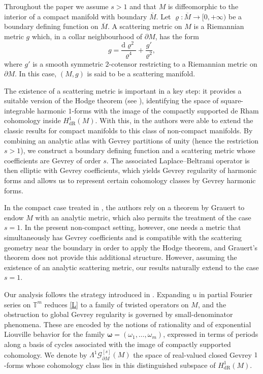 \documentclass[11pt,reqno]{amsart}
\numberwithin{equation}{section}
\begin{document}
	Throughout the paper we assume $s>1$ and that $M$ is diffeomorphic to the interior of a compact manifold with boundary $\overline{M}$. 
	Let $\varrho:\overline{M}\to[0,+\infty)$ be a boundary defining function on $\overline{M}$. 
	A scattering metric on $M$ is a Riemannian metric $g$ which, in a collar neighbourhood of $\partial M$, has the form
	\begin{equation*}
		g = \frac{\mathrm{d}\varrho^2}{\varrho^4}+\frac{g'}{\varrho^2},
	\end{equation*}
	where $g'$ is a smooth symmetric $2$-cotensor restricting to a Riemannian metric on $\partial M$. In this case, $(M,g)$ is said to be a scattering manifold.
	
	The existence of a scattering metric is important in a key step: it provides a suitable version of the Hodge theorem (see \cite[Theorem~6.2]{Melrose_GST}), identifying the space of square-integrable harmonic $1$-forms with the image of the compactly supported de Rham cohomology inside $H^1_{\mathrm{dR}}(M)$. With this, in \cite{CKMT} the authors were able to extend the classic results for compact manifolds to this class of non-compact manifolds. By combining an analytic atlas with Gevrey partitions of unity (hence the restriction $s>1$), we construct a boundary defining function and a scattering metric whose coefficients are Gevrey of order $s$. The associated Laplace--Beltrami operator is then elliptic with Gevrey coefficients, which yields Gevrey regularity of harmonic forms and allows us to represent certain cohomology classes by Gevrey harmonic forms.
	
	In the compact case treated in \cite{ADL2023gh}, the authors rely on a theorem by Grauert \cite{Grauert} to endow $M$ with an analytic metric, which also permits the treatment of the case $s=1$. In the present non-compact setting, however, one needs a metric that simultaneously has Gevrey coefficients and is compatible with the scattering geometry near the boundary in order to apply the Hodge theorem, and
Grauert's theorem does not provide this additional structure. However, assuming the existence of an analytic scattering metric, our results naturally extend to the case $s=1$.
	
	Our analysis follows the strategy introduced in \cite{ADL2023gh}. Expanding $u$ in partial Fourier series on $\mathbb{T}^m$ reduces \eqref{L} to a family of twisted operators on $M$, and the obstruction to global Gevrey regularity is governed by small-denominator phenomena. These are encoded by the notions of rationality and of exponential Liouville behavior for the family $\boldsymbol{\omega}=(\omega_1,\dots,\omega_m)$, expressed in terms of periods along a basis of cycles associated with the image of compactly supported cohomology. We denote by $\mathsf{\Lambda}^1\mathscr{G}^{[s]}_{\partial M}(M)$ the space of real-valued closed Gevrey $1$-forms whose cohomology class lies in this distinguished subspace of $H^1_{\mathrm{dR}}(M)$.
	
\end{document}
